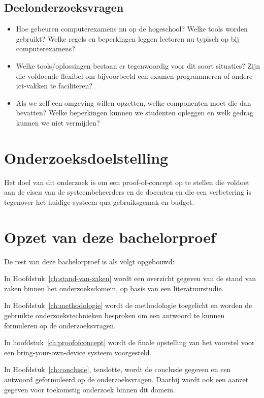 \subsection{Deelonderzoeksvragen}
\begin{itemize}
	 \item Hoe gebeuren computerexamens nu op de hogeschool? Welke tools worden gebruikt? Welke regels en beperkingen leggen lectoren nu typisch op bij computerexamens?
	
	\item Welke tools/oplossingen bestaan er tegenwoordig voor dit soort situaties? Zijn die voldoende flexibel om bijvoorbeeld een examen programmeren of andere ict-vakken te faciliteren?
	
	\item Als we zelf een omgeving willen opzetten, welke componenten moet die dan bevatten? Welke beperkingen kunnen we studenten opleggen en welk gedrag kunnen we niet vermijden?

\end{itemize} 

\section{Onderzoeksdoelstelling}
\label{sec:onderzoeksdoelstelling}

Het doel van dit onderzoek is om een proof-of-concept op te stellen die voldoet aan de eisen van de systeembeheerders en de docenten en die een verbetering is tegenover het huidige systeem qua gebruiksgemak en budget. 

\section{Opzet van deze bachelorproef}
\label{sec:opzet-bachelorproef}


De rest van deze bachelorproef is als volgt opgebouwd:

In Hoofdstuk~\ref{ch:stand-van-zaken} wordt een overzicht gegeven van de stand van zaken binnen het onderzoeksdomein, op basis van een literatuurstudie.

In Hoofdstuk~\ref{ch:methodologie} wordt de methodologie toegelicht en worden de gebruikte onderzoekstechnieken besproken om een antwoord te kunnen formuleren op de onderzoeksvragen.


In hoofdstuk~\ref{ch:proofofconcept} wordt de finale opstelling van het voorstel voor een bring-your-own-device systeem voorgesteld.  

In Hoofdstuk~\ref{ch:conclusie}, tenslotte, wordt de conclusie gegeven en een antwoord geformuleerd op de onderzoeksvragen. Daarbij wordt ook een aanzet gegeven voor toekomstig onderzoek binnen dit domein.

